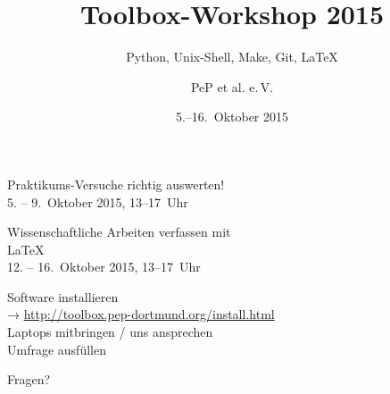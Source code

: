 \documentclass[12pt]{beamer}
\title[Toolbox 2015]{Toolbox-Workshop 2015}
\subtitle{Python, Unix-Shell, Make, Git, \LaTeX{}}
\date{5.–16.~Oktober 2015}
\institute[Pep et al.\ e.V.]{\texttt{[image: logos/pep.pdf]}}
\author{PeP et al. e.\,V.}
\begin{document}
\maketitle

\begin{frame}
  \begin{center}
  \Large Praktikums-Versuche richtig auswerten!\\
  5. – 9.~Oktober 2015, 13–17~Uhr
  \end{center}
\end{frame}

\begin{frame}
  \begin{center}
    Wissenschaftliche Arbeiten verfassen mit \\[0.5\baselineskip]
    \textrm{\Huge\LaTeX{}}\\[0.5\baselineskip]
    12. – 16.~Oktober 2015, 13–17~Uhr
  \end{center}
\end{frame}

\begin{frame}
  \begin{center}
    \Large
    Software installieren\\[0.5\baselineskip]
    → \textcolor{blue!70!black}{\url{http://toolbox.pep-dortmund.org/install.html}}\\[0.5\baselineskip]
    Laptops mitbringen / uns ansprechen\\[0.5\baselineskip]
    Umfrage ausfüllen
  \end{center}
\end{frame}
\begin{frame}
  \Huge\centering
  \textcolor{red!70!black}{Fragen?}
\end{frame}
\end{document}
